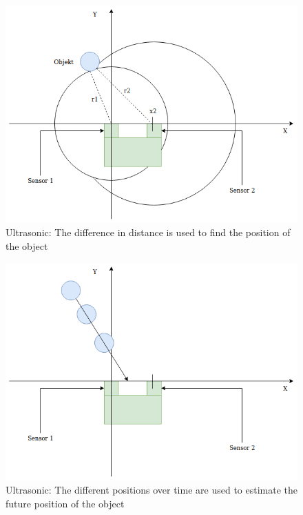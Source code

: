 \begin{figure}[h!]
    \centering
    \includegraphics[scale=0.5]{Images/ultrasonic_trilateration.png}
    \caption{Ultrasonic: The difference in distance is used to find the position of the object}
    \label{fig:ultrasonic_trilateration}
\end{figure}

\begin{figure}[h!]
    \centering
    \includegraphics[scale=0.5]{Images/ultrasonic_motion.png}
    \caption{Ultrasonic: The different positions over time are used to estimate the future position of the object}
    \label{fig:ultrasonic_motion}
\end{figure}
\clearpage
